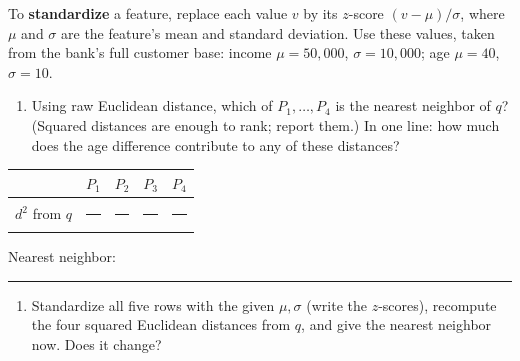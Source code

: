 \documentclass[
  11pt,
]{article}
\providecommand{\tightlist}{%
  \setlength{\itemsep}{0pt}\setlength{\parskip}{0pt}}
\newcommand{\answerspace}[1]{\par\vspace*{#1}}  %
\newcommand{\blank}[1][1.2in]{\rule{#1}{0.4pt}}
\begin{document}
To \textbf{standardize} a feature, replace each value \(v\) by its
\(z\)-score \((v-\mu)/\sigma\), where \(\mu\) and \(\sigma\) are the
feature's mean and standard deviation. Use these values, taken from the
bank's full customer base: income \(\mu = 50{,}000\),
\(\sigma = 10{,}000\); age \(\mu = 40\), \(\sigma = 10\).

\begin{enumerate}
\def\labelenumi{(\alph{enumi})}
\tightlist
\item
  Using raw Euclidean distance, which of \(P_1,\dots,P_4\) is the
  nearest neighbor of \(q\)? (Squared distances are enough to rank;
  report them.) In one line: how much does the age difference contribute
  to any of these distances?
\end{enumerate}

\begin{longtable}[]{@{}
  >{\centering\arraybackslash}p{}
  >{\centering\arraybackslash}p{}
  >{\centering\arraybackslash}p{}
  >{\centering\arraybackslash}p{}
  >{\centering\arraybackslash}p{}@{}}
\toprule\noalign{}
\begin{minipage}[b]{\linewidth}\centering
\end{minipage} & \begin{minipage}[b]{\linewidth}\centering
\(P_1\)
\end{minipage} & \begin{minipage}[b]{\linewidth}\centering
\(P_2\)
\end{minipage} & \begin{minipage}[b]{\linewidth}\centering
\(P_3\)
\end{minipage} & \begin{minipage}[b]{\linewidth}\centering
\(P_4\)
\end{minipage} \\
\midrule\noalign{}
\endhead
\bottomrule\noalign{}
\endlastfoot
\(d^2\) from \(q\) & \blank[0.9in] & \blank[0.9in] & \blank[0.9in] &
\blank[0.9in] \\
\end{longtable}

Nearest neighbor: \blank[0.7in]

\answerspace{1.4in}

\begin{enumerate}
\def\labelenumi{(\alph{enumi})}
\setcounter{enumi}{1}
\tightlist
\item
  Standardize all five rows with the given \(\mu,\sigma\) (write the
  \(z\)-scores), recompute the four squared Euclidean distances from
  \(q\), and give the nearest neighbor now. Does it change?
\end{enumerate}
\end{document}
